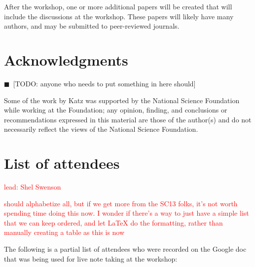 \documentclass[11pt, oneside]{amsart}
\newcommand{\todo}[1]{{\color{blue}$\blacksquare$~\textsf{[TODO: #1]}}}
\newcommand{\note}[1]{ {\textcolor{red}    { #1 }}}
\begin{document}
After the workshop, one or more additional papers will be created that
will include the discussions at the workshop. These papers will likely
have many authors, and may be submitted to peer-reviewed journals.


\section*{Acknowledgments}

\todo{anyone who needs to put something in here should}

Some of the work by Katz was
supported by the National Science Foundation while working at the
Foundation; any opinion, finding, and conclusions or recommendations
expressed in this material are those of the author(s) and do not
necessarily reflect the views of the National Science Foundation.


\appendix
\section{List of attendees}

\note{lead: Shel Swenson}

\note{should alphabetize all, but if we get more from the SC13 folks, it's not worth spending
time doing this now.  I wonder if there's a way to just have a simple list that we can keep ordered, and let LaTeX do the formatting, rather than manually creating a table as this is now}

The following is a partial list of attendees who were recorded on the
Google doc that was being used for live note taking at the workshop:
\end{document}
